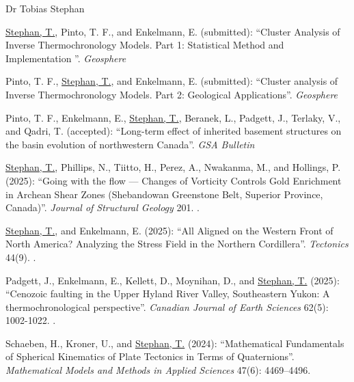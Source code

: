\documentclass[10pt, paper=letter]{scrartcl} %
\begin{document}
\begin{cv}{\textcolor{myred}{\textsf{Dr Tobias Stephan}}}
\begin{cvlist}{}
        \item[-] \ul{Stephan, T.}, Pinto, T. F., and Enkelmann, E. (submitted): \enquote{Cluster Analysis of Inverse Thermochronology Models. Part 1: Statistical Method and Implementation }. \textit{Geosphere}
        
        \item[-] Pinto, T. F., \ul{Stephan, T.}, and Enkelmann, E. (submitted): \enquote{Cluster analysis of Inverse Thermochronology Models. Part 2: Geological Applications}.  \textit{Geosphere}

        \item[17] Pinto, T. F., Enkelmann, E., \ul{Stephan, T.}, Beranek, L., Padgett, J., Terlaky, V., and Qadri, T. (accepted): \enquote{Long-term effect of inherited basement structures on the basin evolution of northwestern Canada}. \textit{GSA Bulletin}

        \item[16] \ul{Stephan, T.}, Phillips, N., Tiitto, H., Perez, A., Nwakanma, M., and Hollings, P. (2025): \enquote{Going with the flow --- Changes of  Vorticity Controls Gold Enrichment in Archean Shear Zones (Shebandowan Greenstone Belt, Superior Province, Canada)}. \textit{Journal of Structural Geology} 201. .

        \item[15] \ul{Stephan, T.}, and Enkelmann, E. (2025): \enquote{All Aligned on the Western Front of North America? Analyzing the Stress Field in the Northern Cordillera}. \textit{Tectonics} 44(9). .

        \item[14] Padgett, J., Enkelmann, E., Kellett, D., Moynihan, D., and \ul{Stephan, T.} (2025): \enquote{Cenozoic faulting in the Upper Hyland River Valley, Southeastern Yukon: A thermochronological perspective}. \textit{Canadian Journal of Earth Sciences} 62(5): 1002-1022. .

        \item[13] Schaeben, H., Kroner, U., and \ul{Stephan, T.} (2024): \enquote{Mathematical Fundamentals of Spherical Kinematics of Plate Tectonics in Terms of Quaternions}. \textit{Mathematical Models and Methods in Applied Sciences} 47(6): 4469--4496. 


\end{cvlist}
\end{cv}
\end{document}

